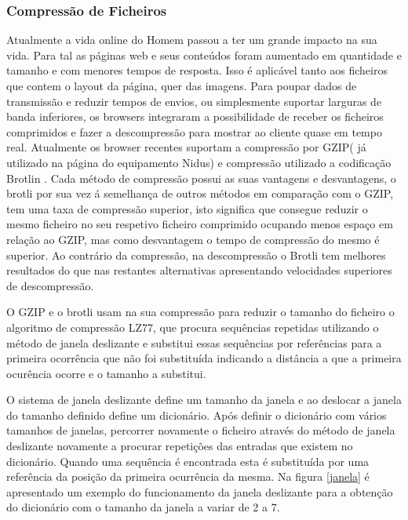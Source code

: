 \subsubsection{Compressão de Ficheiros}
\par
Atualmente a vida online do Homem passou a ter um grande impacto na sua vida. Para tal as páginas web e seus conteúdos foram aumentado em quantidade e tamanho e com menores tempos de resposta. Isso é aplicável tanto aos ficheiros que contem o layout da página, quer das imagens. Para poupar dados de transmissão e reduzir tempos de envios, ou simplesmente suportar larguras de banda inferiores, os browsers integraram a possibilidade de receber os ficheiros comprimidos e fazer a descompressão para mostrar ao cliente quase em tempo real. Atualmente os browser recentes suportam a compressão por GZIP( já utilizado na página do equipamento Nidus) e compressão utilizado a codificação Brotlin \cite{Alakuijala2019} \cite{brotlirfc}.
Cada método de compressão possui as suas vantagens e desvantagens, o brotli por sua vez á semelhança de outros métodos em comparação com o GZIP, tem uma taxa de compressão superior\cite{Alakuijala2015}, isto significa que consegue reduzir o mesmo ficheiro no seu respetivo ficheiro comprimido ocupando menos espaço em relação ao GZIP, mas como desvantagem o tempo de compressão do mesmo é superior. Ao contrário da compressão, na descompressão o Brotli tem melhores resultados do que nas restantes alternativas apresentando velocidades superiores de descompressão.
\par
O GZIP e o brotli usam na sua compressão para reduzir o tamanho do ficheiro o algoritmo de compressão LZ77, que procura sequências repetidas utilizando o método de janela deslizante e substitui essas sequências por referências para a primeira ocorrência que não foi substituída indicando a distância a que a primeira ocurência ocorre e o tamanho a substitui.
\par O sistema de janela deslizante define um tamanho da janela e ao deslocar a janela do tamanho definido define um dicionário. Após definir o dicionário com vários tamanhos de janelas, percorrer novamente o ficheiro através do método de janela deslizante novamente a procurar repetições das entradas que existem no dicionário. Quando uma sequência é encontrada esta é substituída  por uma referência da posição da primeira ocurrência da mesma. Na figura \ref{janela} é apresentado um exemplo do funcionamento da janela deslizante para a obtenção do dicionário com o tamanho da janela a variar de 2 a 7.
